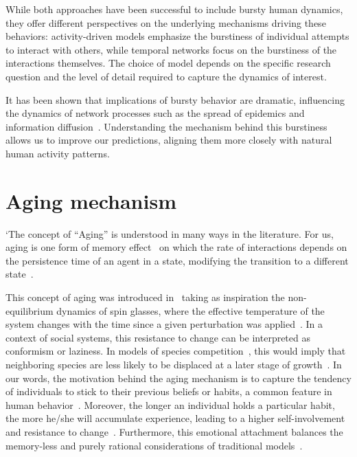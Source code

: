 While both approaches have been successful to include bursty human dynamics, they offer different perspectives on the underlying mechanisms driving these behaviors: activity-driven models emphasize the burstiness of individual attempts to interact with others, while temporal networks focus on the burstiness of the interactions themselves. The choice of model depends on the specific research question and the level of detail required to capture the dynamics of interest.

It has been shown that implications of bursty behavior are dramatic, influencing the dynamics of network processes such as the spread of epidemics and information diffusion~\cite{Rocha2013Bursts, Wang2009Viruses}. Understanding the mechanism behind this burstiness allows us to improve our predictions, aligning them more closely with natural human activity patterns.

\section{\label{sec:Aging mechanism} Aging mechanism}

`The concept of ``Aging'' is understood in many ways in the literature. For us, aging is one form of memory effect~\cite{jkedrzejewski2018impact} on which the rate of interactions depends on the persistence time of an agent in a state, modifying the transition to a different state~\cite{fernandez-gracia-2011,perez-2016,boguna-2014}. 

This concept of aging was introduced in~\cite{stark-2008} taking as inspiration the non-equilibrium dynamics of spin glasses, where the effective temperature of the system changes with the time since a given perturbation was applied~\cite{cugliandolo1993analytical}. In a context of social systems, this resistance to change can be interpreted as conformism or laziness. In models of species competition~\cite{ravasz2004spreading}, this would imply that neighboring species are less likely to be displaced at a later stage of growth~\cite{stark-2008}. In our words, the motivation behind the aging mechanism is to capture the tendency of individuals to stick to their previous beliefs or habits, a common feature in human behavior~\cite{granovetter-1973}. Moreover, the longer an individual holds a particular habit, the more he/she will accumulate experience, leading to a higher self-involvement and resistance to change~\cite{lejarraga2011let}. Furthermore, this emotional attachment balances the memory-less and purely rational considerations of traditional models~\cite{granovetter-1985}.


